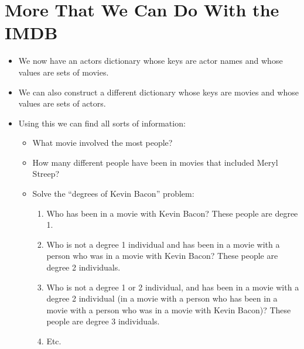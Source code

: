 \documentclass[letterpaper,10pt,english]{sphinxmanual}
\begin{document}
\section{More That We Can Do With the IMDB}
\label{\detokenize{lecture_notes/lec17_dictionaries2:more-that-we-can-do-with-the-imdb}}\begin{itemize}
\item {} 
We now have an actors dictionary whose keys are actor names and
whose values are sets of movies.

\item {} 
We can also construct a different dictionary whose keys are movies
and whose values are sets of actors.

\item {} 
Using this we can find all sorts of information:
\begin{itemize}
\item {} 
What movie involved the most people?

\item {} 
How many different people have been in movies that included
Meryl Streep?

\item {} 
Solve the “degrees of Kevin Bacon” problem:
\begin{enumerate}
\item {} 
Who has been in a movie with Kevin Bacon?  These people are
degree 1.

\item {} 
Who is not a degree 1 individual and has been in a movie with
a person who was in a movie with Kevin Bacon?  These people
are degree 2 individuals.

\item {} 
Who is not a degree 1 or 2 individual, and has been in a
movie with a degree 2 individual (in a movie with a person
who has been in a movie with a person who was in a movie with
Kevin Bacon)?  These people are degree 3 individuals.

\item {} 
Etc.

\end{enumerate}

\end{itemize}

\end{itemize}
\end{document}
